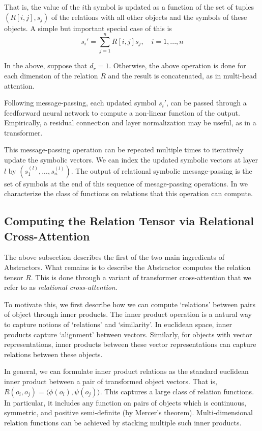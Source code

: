 That is, the value of the $i$th symbol is updated as a function of the set of tuples $(R[i,j], s_j)$ of the relations with all other objects and the symbols of these objects. A simple but important special case of this is
\begin{equation}
    \label{eq:linear_symbolic_mp}
    s_i' = \sum_{j=1}^{n} R[i,j] s_j, \quad i=1, ..., n
\end{equation}

In the above, suppose that $d_r = 1$. Otherwise, the above operation is done for each dimension of the relation $R$ and the result is concatenated, as in multi-head attention.

Following message-passing, each updated symbol $s_i'$, can be passed through a feedforward neural network to compute a non-linear function of the output. Empirically, a residual connection and layer normalization may be useful, as in a transformer.

This message-passing operation can be repeated multiple times to iteratively update the symbolic vectors. We can index the updated symbolic vectors at layer $l$ by $(s_1^{(l)}, ..., s_n^{(l)})$. The output of relational symbolic message-passing is the set of symbols at the end of this sequence of mesage-passing operations. In  we characterize the class of functions on relations that this operation can compute.

\subsection{Computing the Relation Tensor via Relational Cross-Attention}

The above subsection describes the first of the two main ingredients of Abstractors. What remains is to describe the Abstractor computes the relation tensor $R$. This is done through a variant of transformer cross-attention that we refer to as \textit{relational cross-attention}.

To motivate this, we first describe how we can compute `relations' between pairs of object through inner products. The inner product operation is a natural way to capture notions of `relations' and `similarity'. In euclidean space, inner products capture `alignment' between vectors. Similarly, for objects with vector representations, inner products between these vector representations can capture relations between these objects.

In general, we can formulate inner product relations as the standard euclidean inner product between a pair of transformed object vectors. That is, $R(o_i, o_j) = \langle \phi(o_i), \psi(o_j) \rangle$. This captures a large class of relation functions. In particular, it includes any function on pairs of objects which is continuous, symmetric, and positive semi-definite (by Mercer's theorem). Multi-dimensional relation functions can be achieved by stacking multiple such inner products.


